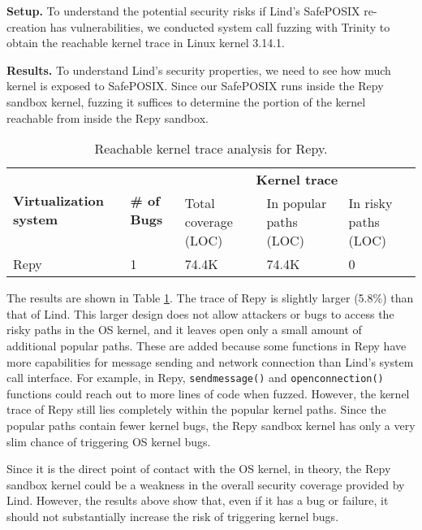 {{{%

\noindent
\textbf{Setup.}
To understand the potential security risks if Lind's SafePOSIX re-creation
has vulnerabilities, we conducted system call fuzzing with Trinity
to obtain the reachable kernel trace in Linux kernel 3.14.1.

\noindent
\textbf{Results.}
To understand Lind's security properties, we need to see how much kernel is exposed to
SafePOSIX. Since our SafePOSIX runs inside the Repy sandbox kernel,
fuzzing it suffices to determine the portion of the kernel reachable from 
inside the Repy sandbox.

\begin{table}
\centering
\scriptsize
\begin{tabular}{|l|l|l|l|l|}
  \hline
  \multirow{3}{1.5cm}{\bf Virtualization system} & \multirow{3}{0.5cm}{\bf \# of Bugs} & \multicolumn{3}{c|}{\bf Kernel trace} \\ \cline{3-5}
  & & \multirow{2}{1.5cm}{Total coverage (LOC)} & \multirow{2}{1.3cm}{In popular paths (LOC)} & \multirow{2}{1.3cm}{In risky paths (LOC)}  \\
  & & & & \\  \hline
  Repy & 1 & 74.4K & 74.4K & 0 \\
  \hline
\end{tabular}\caption{\small Reachable kernel trace analysis for Repy.}
\label{table:trace-Repy}
\end{table}

The results are shown in Table \ref{table:trace-Repy}.
The trace of Repy is slightly larger (5.8\%) than that of Lind.
This larger design does not allow attackers or bugs to
access the risky paths in the OS kernel, and it leaves open only a small amount of
additional popular paths. These are added because some functions in Repy
have more capabilities for message sending and network connection than Lind's
system call interface.
For example, in Repy,
\texttt{sendmessage()} and \texttt{openconnection()}
functions could reach out to more lines of code when fuzzed. However, the kernel
trace of Repy still lies completely within the popular kernel paths.
Since the popular paths contain fewer kernel bugs, the Repy sandbox kernel
has only a very slim chance of triggering OS kernel bugs.

Since it is the direct point of contact with the OS kernel, in theory, the Repy
 sandbox kernel could be a weakness in the overall security coverage provided by Lind.
However, the results above show that, even if it has a
bug or failure, it should not substantially increase the risk of triggering
kernel bugs.

}}}

